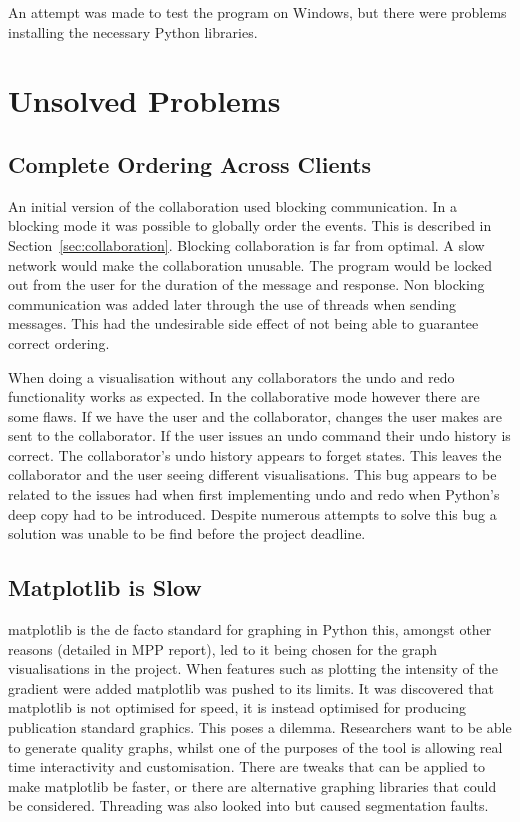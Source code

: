 An attempt was made to test the program on Windows, but there were problems installing the necessary Python libraries.

\section{Unsolved Problems}

\subsection{Complete Ordering Across Clients}

An initial version of the collaboration used blocking communication.  In a blocking mode it was possible to globally order the events.  This is described in Section~\ref{sec:collaboration}.  Blocking collaboration is far from optimal.  A slow network would make the collaboration unusable.  The program would be locked out from the user for the duration of the message and response.  Non blocking communication was added later through the use of threads when sending messages.  This had the undesirable side effect of not being able to guarantee correct ordering.


When doing a visualisation without any collaborators the undo and redo functionality works as expected.  In the collaborative mode however there are some flaws.  If we have the user and the collaborator, changes the user makes are sent to the collaborator.  If the user issues an undo command their undo history is correct.  The collaborator's undo history appears to forget states.  This leaves the collaborator and the user seeing different visualisations.  This bug appears to be related to the issues had when first implementing undo and redo when Python's deep copy had to be introduced.  Despite numerous attempts to solve this bug a solution was unable to be find before the project deadline.

\subsection{Matplotlib is Slow}

matplotlib is the de facto standard for graphing in Python this, amongst other reasons (detailed in MPP report), led to it being chosen for the graph visualisations in the project.  When features such as plotting the intensity of the gradient were added matplotlib was pushed to its limits.  It was discovered that matplotlib is not optimised for speed, it is instead optimised for producing publication standard graphics.  This poses a dilemma.  Researchers want to be able to generate quality graphs, whilst one of the purposes of the tool is allowing real time interactivity and customisation.  There are tweaks that can be applied to make matplotlib be faster, or there are alternative graphing libraries that could be considered.  Threading was also looked into but caused segmentation faults.


